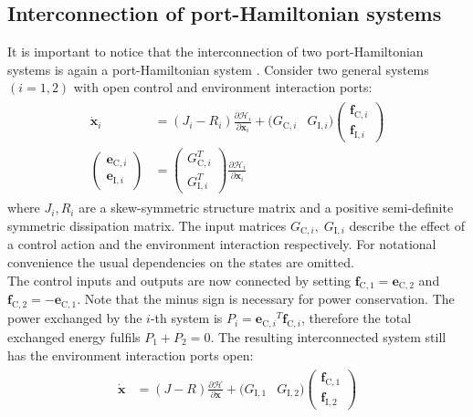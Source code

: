 \documentclass[a4paper,twoside, openright,12pt]{report}
\newcommand{\f}[1]{\boldsymbol{#1}}
\newcommand{\g}[1]{\text{#1}}
\begin{document}
{\subsection{Interconnection of port-Hamiltonian systems}
It is important to notice that the interconnection of two port-Hamiltonian systems is again a port-Hamiltonian system \cite{Schaft_14}. Consider two general systems $(i=1,2)$ with open control and environment interaction ports:
\begin{eqnarray}
\begin{aligned}
	\dot{\f{x}}_i &= (J_i - R_i)\frac{\partial \mathcal{H}_i}{\partial \f{x}_i} + (G_{\g{C},i} & G_{\g{I},i})\begin{pmatrix}\f{f}_{\g{C},i} \\ \f{f}_{\g{I},i}\end{pmatrix}\\
	\begin{pmatrix}\f{e}_{\g{C},i} \\ \f{e}_{\g{I},i}\end{pmatrix} &= \begin{pmatrix}G_{\g{C},i}^T \\ G_{\g{I},i}^T\end{pmatrix}\frac{\partial \mathcal{H}_i}{\partial \f{x}_i}
\end{aligned}
\end{eqnarray}
where $J_i,R_i$ are a skew-symmetric structure matrix and a positive semi-definite symmetric dissipation matrix. The input matrices $G_{\g{C},i},\; G_{\g{I},i}$ describe the effect of a control action and the environment interaction respectively.
For notational convenience the usual dependencies on the states are omitted.\\
The control inputs and outputs are now connected by setting $\f{f}_{\g{C},1} = \f{e}_{\g{C},2} $ and $ \f{f}_{\g{C},2} = -\f{e}_{\g{C},1} $. Note that the minus sign is necessary for power conservation. The power exchanged by the $i$-th system is $P_i = {\f{e}_{\g{C},i}}^T \f{f}_{\g{C},i}$, therefore the total exchanged energy fulfils $ P_1 + P_2 = 0 $. The resulting interconnected system still has the environment interaction ports open:
\begin{eqnarray}
\begin{aligned}
	\dot{\f{x}} &= (J - R)\frac{\partial \mathcal{H}}{\partial \f{x}}+ (G_{\g{I},1} & G_{\g{I},2})\begin{pmatrix}\f{f}_{\g{C},1} \\ \f{f}_{\g{I},2}\end{pmatrix}\\

\end{aligned}
\end{eqnarray}}
\end{document}
